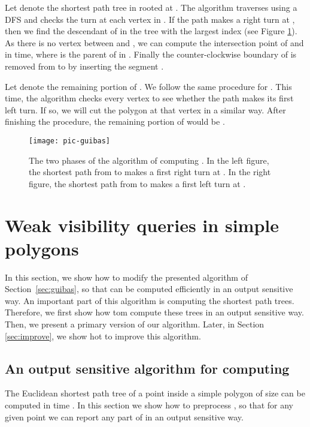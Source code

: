\documentclass[5p]{elsarticle}
\begin{document}
Let  denote the shortest path tree in  rooted at . 
The algorithm traverses  using a DFS and checks the turn at each vertex
 in . If the path makes a right turn at , then 
we find the descendant of  in the tree with the largest index  (see Figure \ref{fig:guibas}).
As there is no vertex between  and ,
we can compute the intersection point  of  and  
in  time, where  is the
parent of  in .
Finally the counter-clockwise boundary 
of  is removed from  to  by inserting the segment .

Let  denote the remaining portion of . We follow the same procedure for
. This time, the algorithm checks every vertex to see whether the path 
makes its first left turn. If so, we will cut the polygon at that vertex in a similar way. 
After finishing the procedure, 
the remaining portion of  would be .


\begin{figure}[h]
  \centering
  \texttt{[image: pic-guibas]} 
  \caption{ The two phases of the algorithm of computing .
	In the left figure, the shortest path from  to  makes a first right turn at . In 
	the right figure, the shortest path from  to  makes a first left turn at .}
  \label{fig:guibas}
\end{figure}



\section{Weak visibility queries in simple polygons} \label{sec:first-alg}
In this section, we show how to modify the presented algorithm of Section~\ref{sec:guibas}, 
so that  can be computed efficiently in an output sensitive way.
An important part of this algorithm is computing the shortest path trees. Therefore,
we first show how tom compute these trees in an output sensitive way. Then,
we present a primary version of our algorithm. 
Later, in Section \ref{sec:improve}, we show hot to improve this algorithm.

\subsection{An output sensitive algorithm for computing } \label{sec:spt}
The Euclidean shortest path tree of a point inside a simple polygon of size  
can be computed in  time \cite{guibas}.
In this section we show how to preprocess , so that
for any given point  we can report any part of  
in an output sensitive way.
\end{document}
